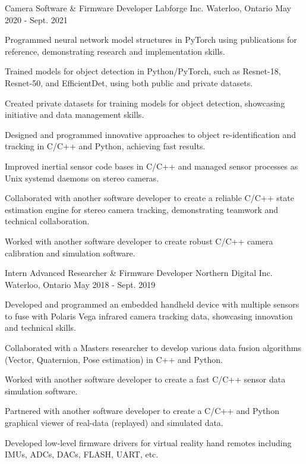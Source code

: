 \begin{cventries}
  \cventry
    {Camera Software \& Firmware Developer} %
    {Labforge Inc.} %
    {Waterloo, Ontario} %
    {May 2020 - Sept. 2021} %
    {
      \begin{cvitems} %
        \item {Programmed neural network model structures in PyTorch using publications for reference, demonstrating research and implementation skills.}
        \item {Trained models for object detection in Python/PyTorch, such as Resnet-18, Resnet-50, and EfficientDet, using both public and private datasets.}
        \item {Created private datasets for training models for object detection, showcasing initiative and data management skills.}
        \item {Designed and programmed innovative approaches to object re-identification and tracking in C/C++ and Python, achieving fast results.}
        \item {Improved inertial sensor code bases in C/C++ and managed sensor processes as Unix systemd daemons on stereo cameras.}
        \item {Collaborated with another software developer to create a reliable C/C++ state estimation engine for stereo camera tracking, demonstrating teamwork and technical collaboration.}
        \item {Worked with another software developer to create robust C/C++ camera calibration and simulation software.}
      \end{cvitems}
    }

  \cventry
    {Intern Advanced Researcher \& Firmware Developer} %
    {Northern Digital Inc.} %
    {Waterloo, Ontario} %
    {May 2018 - Sept. 2019} %
    {
      \begin{cvitems} %
        \item {Developed and programmed an embedded handheld device with multiple sensors to fuse with Polaris Vega infrared camera tracking data, showcasing innovation and technical skills.}
        \item {Collaborated with a Masters researcher to develop various data fusion algorithms (Vector, Quaternion, Pose estimation) in C++ and Python.}
        \item {Worked with another software developer to create a fast C/C++ sensor data simulation software.}
        \item {Partnered with another software developer to create a C/C++ and Python graphical viewer of real-data (replayed) and simulated data.}
        \item {Developed low-level firmware drivers for virtual reality hand remotes including IMUs, ADCs, DACs, FLASH, UART, etc.}
      \end{cvitems}
    }


\end{cventries}
